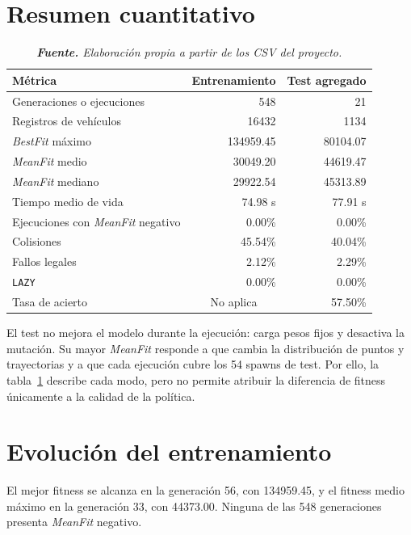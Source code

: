 \section{Resumen cuantitativo}

\begin{table}[H]
\centering
\caption{Resultados principales del entrenamiento y del bloque de test del 18 de junio de 2026.}
\label{tab:resultados-principales}
\begin{tabular}{lrr}
\toprule
\textbf{Métrica} & \textbf{Entrenamiento} & \textbf{Test agregado}\\
\midrule
Generaciones o ejecuciones & 548 & 21\\
Registros de vehículos & 16432 & 1134\\
\textit{BestFit} máximo & 134959.45 & 80104.07\\
\textit{MeanFit} medio & 30049.20 & 44619.47\\
\textit{MeanFit} mediano & 29922.54 & 45313.89\\
Tiempo medio de vida & 74.98 s & 77.91 s\\
Ejecuciones con \textit{MeanFit} negativo & 0.00\% & 0.00\%\\
Colisiones & 45.54\% & 40.04\%\\
Fallos legales & 2.12\% & 2.29\%\\
\texttt{LAZY} & 0.00\% & 0.00\%\\
Tasa de acierto & \multicolumn{1}{c}{No aplica} & 57.50\%\\
\bottomrule
\end{tabular}
\caption*{\textit{\textbf{Fuente.} Elaboración propia a partir de los CSV del proyecto.}}
\end{table}

El test no mejora el modelo durante la ejecución: carga pesos fijos y desactiva la mutación. Su mayor \textit{MeanFit} responde a que cambia la distribución de puntos y trayectorias y a que cada ejecución cubre los 54 spawns de test. Por ello, la tabla~\ref{tab:resultados-principales} describe cada modo, pero no permite atribuir la diferencia de fitness únicamente a la calidad de la política.

\section{Evolución del entrenamiento}

El mejor fitness se alcanza en la generación 56, con 134959.45, y el fitness medio máximo en la generación 33, con 44373.00. Ninguna de las 548 generaciones presenta \textit{MeanFit} negativo.

